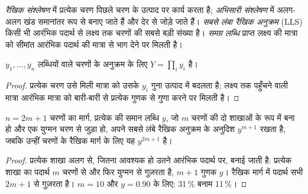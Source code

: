 \begin{definition}[मार्ग की संरचना]\label{def:b3:total-synthesis:architecture}
\emph{रैखिक संश्लेषण} में प्रत्येक चरण पिछले चरण के
उत्पाद पर कार्य करता है; \emph{अभिसारी संश्लेषण} में
अलग-अलग खंड समानांतर रूप से बनाए जाते हैं और देर से जोड़े जाते हैं।
\emph{सबसे लंबा रैखिक अनुक्रम} (LLS) किसी भी आरंभिक
पदार्थ से लक्ष्य तक चरणों की सबसे बड़ी संख्या है। \emph{समग्र
लब्धि} प्राप्त लक्ष्य की मात्रा को सीमांत आरंभिक पदार्थ की
मात्रा से भाग देने पर मिलती है।
\end{definition}

\begin{proposition}[समग्र लब्धि]\label{prop:b3:total-synthesis:overall-yield}
$y_1, \dots, y_n$ लब्धियों वाले चरणों के अनुक्रम के लिए  $Y = \prod_i y_i$ है।
\end{proposition}

\begin{proof}
प्रत्येक चरण उसे मिली मात्रा को उसके $y_i$ गुना उत्पाद में बदलता है; लक्ष्य तक
पहुँचने वाली मात्रा आरंभिक मात्रा को बारी-बारी से प्रत्येक गुणक से गुणा करने पर
मिलती है।
\end{proof}

\begin{proposition}[अभिसरण]\label{prop:b3:total-synthesis:convergent}
$n = 2m + 1$ चरणों का मार्ग, प्रत्येक की समान लब्धि $y$, जो $m$ चरणों की दो शाखाओं के रूप में बना हो
और एक युग्मन चरण से जुड़ा हो, अपने सबसे लंबे रैखिक अनुक्रम के अनुदिश  $y^{m+1}$ रखता है,
जबकि उन्हीं चरणों के रैखिक मार्ग के लिए यह $y^{2m+1}$ है।
\end{proposition}

\begin{proof}
प्रत्येक शाखा अलग से, जितना आवश्यक हो उतने आरंभिक पदार्थ पर, बनाई जाती है:
प्रत्येक शाखा का पदार्थ $m$ चरणों से और फिर युग्मन से गुज़रता है, $m + 1$
गुणक $y$। रैखिक मार्ग में पदार्थ सभी $2m + 1$ से गुज़रता है। $m = 10$
और $y = 0.90$ के लिए: 31\,\% बनाम 11\,\%।
\end{proof}

